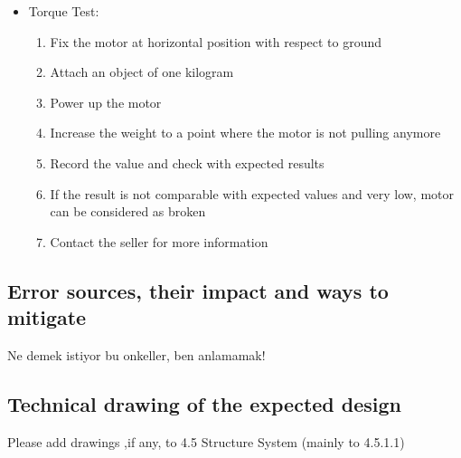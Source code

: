 \documentclass[a4paper,12pt]{article}
\begin{document}
		\begin{itemize}
			\item {Torque Test:} 
				\begin{enumerate}
					\item Fix the motor at horizontal position with respect to ground \vspace{-0.2cm}
					\item Attach an object of one kilogram \vspace{-0.2cm}
					\item Power up the motor \vspace{-0.2cm}
					\item Increase the weight to a point where the motor is not pulling anymore \vspace{-0.2cm}
					\item Record the value and check with expected results \vspace{-0.2cm}
					\item If the result is not comparable with expected values and very low, motor can be considered as broken \vspace{-0.2cm}
					\item Contact the seller for more information 
				\end{enumerate}
		\end{itemize}
	
	
	
	
	
	
	\newpage
	\subsection{ Error sources, their impact and ways to mitigate}
	
	Ne demek istiyor bu onkeller, ben anlamamak!
	
	\subsection{Technical drawing of the expected design}
	
	Please add drawings ,if any, to 4.5 Structure System (mainly to 4.5.1.1)
	
	
	
\end{document}
